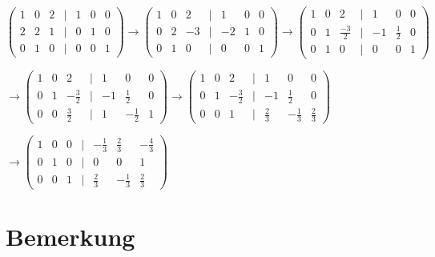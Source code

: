 \documentclass[a4paper, openany]{book}
\begin{document}
        \par \medskip

        $\begin{pmatrix}1 & 0 & 2 & | & 1 & 0 & 0 \\ 2 & 2 & 1 & | & 0 & 1 & 0 \\ 0 & 1 & 0 & | & 0 & 0 & 1 \end{pmatrix} \rightarrow \begin{pmatrix}1 & 0 & 2 & | & 1 & 0 & 0 \\ 0 & 2 & -3 & | & -2 & 1 &  0 \\ 0 & 1 & 0 & | & 0 & 0 & 1 \end{pmatrix} \rightarrow \begin{pmatrix}1 & 0 & 2 & | & 1 & 0 & 0 \\ 0 & 1 & \frac{-3}{2} & | & -1 & \frac{1}{2} & 0 \\ 0 & 1 & 0  & | & 0 & 0 & 1 \end{pmatrix}$

        \par \medskip
        \par \medskip

        $\rightarrow \begin{pmatrix}1 & 0 & 2 & | & 1 & 0 & 0 \\ 0 & 1 & - \frac{3}{2} & | & -1 & \frac{1}{2} & 0 \\ 0 & 0 & \frac{3}{2} & | & 1 & - \frac{1}{2} & 1 \end{pmatrix} \rightarrow \begin{pmatrix}1 & 0 & 2 & | & 1 & 0 & 0 \\ 0 & 1 & - \frac{3}{2} & | & -1 & \frac{1}{2} & 0 \\ 0 & 0 & 1 & | & \frac{2}{3} & - \frac{1}{3} & \frac{2}{3} \end{pmatrix}$

        \par \medskip
        \par \medskip

        $\rightarrow \begin{pmatrix}1 & 0 & 0 & | & - \frac{1}{3} & \frac{2}{3} & - \frac{4}{3} \\ 0 & 1 & 0 & | & 0 & 0 & 1 \\ 0 & 0 & 1 & | & \frac{2}{3} & - \frac{1}{3} & \frac{2}{3} \end{pmatrix}$

        \section{Bemerkung}
\end{document}
